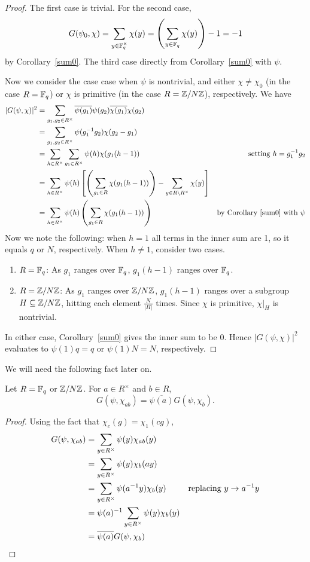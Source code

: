 \begin{proof}
The first case is trivial. For the second case,
\[
G(\psi_0,\chi)=\sum_{y\in \mathbb{F}_q^{\times}}\chi(y)=\left( { \sum_{y\in \mathbb{F}_q} \chi(y)} \right)-1=-1
\]
by Corollary~\ref{sum0}. The third case directly from Corollary~\ref{sum0} with $\psi$. 

Now we consider the case case when $\psi$ is nontrivial, and either $\chi\ne \chi_0$ (in the case $R=\mathbb{F}_q$) or $\chi$ is primitive (in the case $R=\mathbb{Z}/N\mathbb{Z}$), respectively. We have
\begin{align*}
|G(\psi,\chi)|^2&=\sum_{g_1,g_2\in R^{\times}}
\overline{\psi(g_1)}\psi(g_2)\overline{\chi(g_1)}\chi(g_2)\\
&=\sum_{g_1,g_2\in R^{\times}}\psi(g_1^{-1}g_2)\chi(g_2-g_1)\\
&=\sum_{h\in R^{\times}} \sum_{g_1\in R^{\times}}\psi(h)\chi(g_1(h-1))&\text{setting }h=g_1^{-1}g_2\\
&=\sum_{h\in R^{\times}} \psi(h)\ba{\pa{\sum_{g_1\in R}\chi(g_1(h-1))}-\sum_{y\in R\bs R^{\times}} \chi(y)}\\
&=\sum_{h\in R^{\times}} \psi(h)\pa{\sum_{g_1\in R}\chi(g_1(h-1))}&\text{by Corollary \ref{sum0} with }\psi%
\end{align*}
Now we note the following: when $h=1$ all terms in the inner sum are 1, so it equals $q$ or $N$, respectively. When $h\ne 1$, consider two cases.
\begin{enumerate}
\item
$R=\mathbb{F}_q$: As $g_1$ ranges over $\mathbb{F}_q$, $g_1(h-1)$ ranges over $\mathbb{F}_q$.
\item
$R=\mathbb{Z}/N\mathbb{Z}$: As $g_1$ ranges over $\mathbb{Z}/N\mathbb{Z}$, $g_1(h-1)$ ranges over a subgroup $H\subseteq \mathbb{Z}/N\mathbb{Z}$, hitting each element $\frac{N}{|H|}$ times. Since $\chi$ is primitive, $\chi|_H$ is nontrivial.
\end{enumerate}
In either case, Corollary~\ref{sum0} gives the inner sum to be 0. Hence $|G(\psi,\chi)|^2$ evaluates to $\psi(1)q=q$ or $\psi(1)N=N$, respectively.
\end{proof}
We will need the following fact later on.
\begin{pr}
Let $R=\mathbb{F}_q$ or $\mathbb{Z}/N\mathbb{Z}$. 
For $a\in R^{\times}$ and $b\in R$,
\[G(\psi,\chi_{ab})=\overline{\psi(a)}G(\psi,\chi_b).\]
\end{pr}
\begin{proof}
Using the fact that $\chi_c(g)=\chi_1(cg)$,
\begin{align*}
G(\psi,\chi_{ab})&=\sum_{y\in R^{\times}}\psi(y)\chi_{ab}(y)\\
&=\sum_{y\in R^{\times}}\psi(y)\chi_{b}(ay)\\
&=\sum_{y\in R^{\times}}\psi(a^{-1}y)\chi_{b}(y)&\text{replacing } y\to a^{-1}y \\
&=\psi(a)^{-1}\sum_{y\in R^{\times}}\psi(y)\chi_{b}(y)\\
&=\overline{\psi(a)}G(\psi,\chi_b)\qedhere
\end{align*}
\end{proof}
